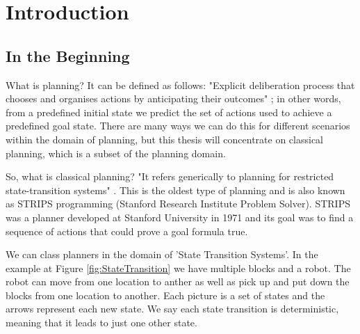 
\chapter{Introduction} %

\label{Chapter1} %




\section{In the Beginning}
What is planning? It can be defined as follows: "Explicit deliberation process that chooses and organises actions by anticipating their outcomes" \cite{PlanningBook}; in other words, from a predefined initial state we predict the set of actions used to achieve a predefined goal state. There are many ways we can do this for different scenarios within the domain of planning, but this thesis will concentrate on classical planning, which is a subset of the planning domain. 

So, what is classical planning? "It refers generically to planning for restricted state-transition systems" \cite{PlanningBook}. This is the oldest type of planning and is also known as STRIPS programming (Stanford Research Institute Problem Solver). STRIPS was a planner developed at Stanford University in 1971 \cite{Strips} and its goal was to find a sequence of actions that could prove a goal formula true.

We can class planners in the domain of 'State Transition Systems'. In the example at Figure \ref{fig:StateTransition} we have multiple blocks and a robot. The robot can move from one location to anther as well as pick up and put down the blocks from one location to another. Each picture is a set of states and the arrows represent each new state. We say each state transition is deterministic, meaning that it leads to just one other state. 

